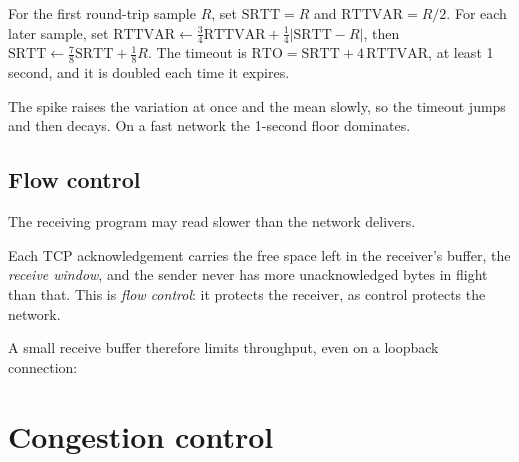 \begin{method}\label{met:b2:transport-layer:rto}
For the first round-trip sample $R$, set $\mathrm{SRTT} = R$ and $\mathrm{RTTVAR} = R/2$. For each later sample, set
$\mathrm{RTTVAR} \leftarrow \frac34 \mathrm{RTTVAR} + \frac14 |\mathrm{SRTT} - R|$, then $\mathrm{SRTT} \leftarrow
\frac78 \mathrm{SRTT} + \frac18 R$. The timeout is $\mathrm{RTO} = \mathrm{SRTT} + 4\,\mathrm{RTTVAR}$, at least 1
second, and it is doubled each time it expires.
\end{method}


\label{out:b2:transport-layer:rto}

The spike raises the variation at once and the mean slowly, so the timeout jumps and then decays. On a fast network
the 1-second floor dominates.

\subsection{Flow control}

The receiving program may read slower than the network delivers.

\begin{definition}\label{def:b2:transport-layer:flow-control}
Each TCP acknowledgement carries the free space left in the receiver's buffer, the \emph{receive
window}, and the sender never has more unacknowledged bytes in flight than that. This is
\emph{flow control}: it protects the receiver, as  control protects the network.
\end{definition}

 A small
receive buffer therefore limits throughput, even on a loopback connection:

\label{out:b2:transport-layer:bulk}

\section{Congestion control}\label{sec:b2:transport-layer:congestion}

